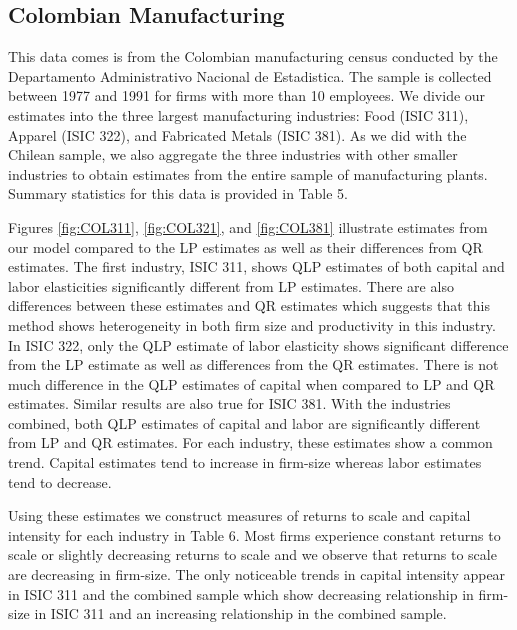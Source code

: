 \documentclass[11pt]{article}
\begin{document}
\subsection{Colombian Manufacturing}
This data comes is from the Colombian manufacturing census conducted by the Departamento Administrativo Nacional de Estadistica. The sample is collected between 1977 and 1991 for firms with more than 10 employees. We divide our estimates into the three largest manufacturing industries: Food (ISIC 311), Apparel (ISIC 322), and Fabricated Metals (ISIC 381). As we did with the Chilean sample, we also aggregate the three industries with other smaller industries to obtain estimates from the entire sample of manufacturing plants. Summary statistics for this data is provided in Table 5.



Figures \ref{fig:COL311}, \ref{fig:COL321}, and \ref{fig:COL381} illustrate estimates from our model compared to the LP estimates as well as their differences from QR estimates. The first industry, ISIC 311, shows QLP estimates of both capital and labor elasticities significantly different from LP estimates. There are also differences between these estimates and QR estimates which suggests that this method shows heterogeneity in both firm size and productivity in this industry. In ISIC 322, only the QLP estimate of labor elasticity shows significant difference from the LP estimate as well as differences from the QR estimates. There is not much difference in the QLP estimates of capital when compared to LP and QR estimates. Similar results are also true for ISIC 381. With the industries combined, both QLP estimates of capital and labor are significantly different from LP and QR estimates. For each industry, these estimates show a common trend. Capital estimates tend to increase in firm-size whereas labor estimates tend to decrease.

Using these estimates we construct measures of returns to scale and capital intensity for each industry in Table 6. Most firms experience constant returns to scale or slightly decreasing returns to scale and we observe that returns to scale are decreasing in firm-size. The only noticeable trends in capital intensity appear in ISIC 311 and the combined sample which show decreasing relationship in firm-size in ISIC 311 and an increasing relationship in the combined sample.  
\end{document}

